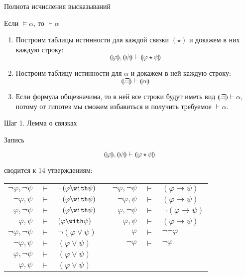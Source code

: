 \documentclass[aspectratio=169]{beamer}
\begin{document}
\begin{frame}{Полнота исчисления высказываний}

\begin{thmrus}
Если $\models\alpha$, то $\vdash\alpha$
\end{thmrus}\pause

\begin{enumerate}
\item Построим таблицы истинности для каждой связки $(\star)$ и докажем в них каждую строку:
$$ \llparenthesis\varphi\rrparenthesis, \llparenthesis\psi\rrparenthesis \vdash \llparenthesis\varphi\star\psi\rrparenthesis$$\pause
\vspace{-0.5cm}
\item Построим таблицу истинности для $\alpha$ и докажем в ней каждую строку:
$$\llparenthesis \Xi \rrparenthesis \vdash \llparenthesis \alpha \rrparenthesis$$\pause
\vspace{-0.5cm}
\item Если формула общезначима, то в ней все строки будут иметь вид $\llparenthesis \Xi \rrparenthesis \vdash\alpha$,
потому от гипотез мы сможем избавиться и получить требуемое $\vdash\alpha$.
\end{enumerate}

\end{frame}

\begin{frame}{Шаг 1. Лемма о связках}

Запись

$$\llparenthesis\varphi\rrparenthesis, \llparenthesis\psi\rrparenthesis \vdash \llparenthesis\varphi\star\psi\rrparenthesis$$

сводится к 14 утверждениям:

\begin{center}\begin{tabular}{rclp{1cm}rcl}
$\neg\varphi, \neg\psi$&$ \vdash $&$\neg (\varphi \with \psi)$& & $\neg\varphi, \neg\psi$&$ \vdash $&$     (\varphi \rightarrow  \psi)$ \\
$\neg\varphi,     \psi$&$ \vdash $&$\neg (\varphi \with \psi)$& &$\neg\varphi,     \psi$&$ \vdash $&$     (\varphi \rightarrow  \psi)$ \\
$    \varphi, \neg\psi$&$ \vdash $&$\neg (\varphi \with \psi)$& &$ \varphi, \neg\psi$&$ \vdash $&$\neg (\varphi \rightarrow  \psi)$ \\
$    \varphi,     \psi$&$ \vdash $&$     (\varphi \with \psi)$& &$    \varphi,     \psi$&$ \vdash $&$     (\varphi \rightarrow  \psi)$ \\
$\neg\varphi, \neg\psi$&$ \vdash $&$\neg (\varphi \vee  \psi)$& &$    \varphi          $&$ \vdash $&$     \neg\neg\varphi$ \\
$\neg\varphi,     \psi$&$ \vdash $&$     (\varphi \vee  \psi)$& &$\neg\varphi          $&$ \vdash $&$         \neg\varphi$\\
$    \varphi, \neg\psi$&$ \vdash $&$     (\varphi \vee  \psi)$ \\
$    \varphi,     \psi$&$ \vdash $&$     (\varphi \vee  \psi)$
\end{tabular}\end{center}
\end{frame}
\end{document}
